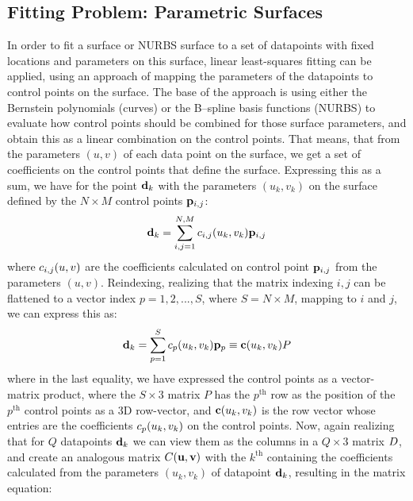 \subsection{Fitting Problem: Parametric Surfaces}
In order to fit a \Bez surface or NURBS surface to a set of datapoints with fixed locations and parameters on this surface, linear least-squares fitting can be applied, using an approach of mapping the parameters of the datapoints to control points on the surface. The base of the approach is using either the Bernstein polynomials (\Bez curves) or the B--spline basis functions (NURBS) to evaluate how control points should be combined for those surface parameters, and obtain this as a linear combination on the control points. That means, that from the parameters $(u,v)$ of each data point on the surface, we get a set of coefficients on the control points that define the surface. Expressing this as a sum, we have for the point $\lsDataPointi{k}$ with the parameters $(u_k,v_k)$ on the surface defined by the $N \times M$ control points $\lsControlPointi{i,j}$:
\begin{equation}
\lsDataPointi{k} = \sum\limits_{i,j=1}^{N,M} \lsControlPointCoefi{i,j}(u_k,v_k) \lsControlPointi{i,j}
\end{equation} 
where $\lsControlPointCoefi{i,j}(u,v)$ are the coefficients calculated on control point $\lsControlPointi{i,j}$ from the parameters $(u,v)$. Reindexing, realizing that the matrix indexing $i,j$ can be flattened to a vector index $p = 1,2,...,S$, where $S=N\times M$, mapping to $i$ and $j$, we can express this as:
\begin{equation}
\lsDataPointi{k} = \sum\limits_{p=1}^{S} \lsControlPointCoefi{p}(u_k,v_k) \lsControlPointi{p} \equiv \vec{\lsControlPointCoef}(u_k,v_k)\lsControlPointMatrix
\label{eqn:lsmatrix1}
\end{equation} 
where in the last equality, we have expressed the control points as a vector-matrix product, where the $S\times 3$ matrix $P$ has the $p^\text{th}$ row as the position of the $p^\text{th}$ control points as a 3D row-vector, and $\vec{\lsControlPointCoef}(u_k,v_k)$ is the row vector whose entries are the coefficients $\lsControlPointCoefi{p}(u_k,v_k)$ on the control points. Now, again realizing that for $Q$ datapoints $\lsDataPointi{k}$ we can view them as the columns in a $Q\times 3$ matrix $\lsDataPointMatrix$, and create an analogous matrix $\lsControlPointCoefMatrix(\vec{u},\vec{v})$ with the $k^\text{th}$ containing the coefficients calculated from the parameters $(u_k,v_k)$ of datapoint $\lsDataPointi{k}$, resulting in the matrix equation:

